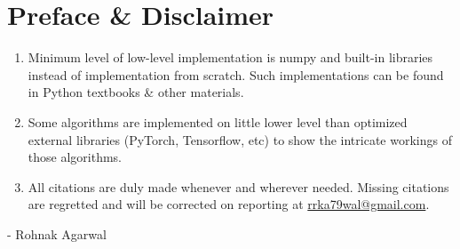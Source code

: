\chapter*{Preface \& Disclaimer}

\begin{enumerate}[itemsep=0.3cm]
    \item Minimum level of low-level implementation is numpy and built-in libraries instead of implementation from scratch. Such implementations can be found in Python textbooks \& other materials.

    \item Some algorithms are implemented on little lower level than optimized external libraries (PyTorch, Tensorflow, etc) to show the intricate workings of those algorithms.

    \item All citations are duly made whenever and wherever needed. Missing citations are regretted and will be corrected on reporting at \href{mailto:rrka79wal@gmail.com}{rrka79wal@gmail.com}.

    
\end{enumerate}

\vspace{1cm}

- Rohnak Agarwal











